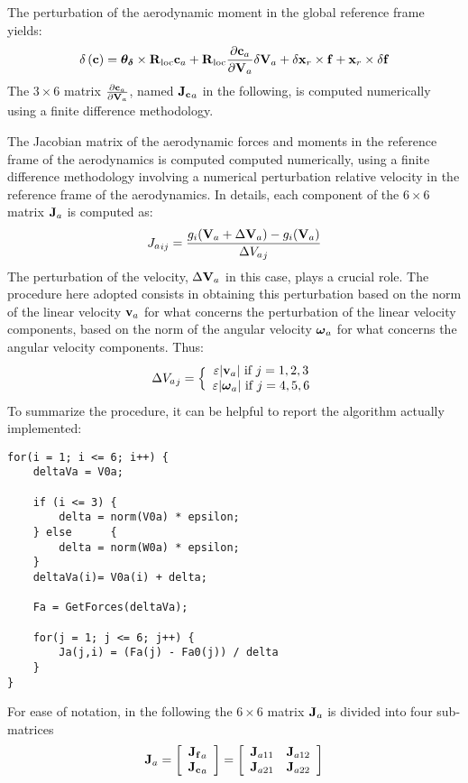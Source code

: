 The perturbation of the aerodynamic moment in the global reference frame
yields:
\begin{equation}
	\delta\plbr{\T{c}} = \T{\theta_{\delta}}\times\T{R}_{\text{loc}}\T{c}_a + 
				\T{R}_{\text{loc}}\frac{\partial\T{c}_a}{\partial\T{V}_a}
				\delta\T{V}_a + \delta \T{x}_r\times\T{f} + 
				\T{x}_r\times\delta\T{f}
\end{equation}
The $3\times6$ matrix $\frac{\partial\T{c}_a}{\partial\T{V}_a}$, 
named $\T{J_c}_a$ in the
following, is computed numerically using a finite difference methodology.

The Jacobian matrix of the aerodynamic forces and moments in the reference 
frame of the aerodynamics is computed computed numerically, using a finite 
difference methodology involving a numerical perturbation relative velocity
in the reference frame of the aerodynamics. In details, each component
of the $6\times6$ matrix $\T{J}_a$ is computed as:
\begin{equation}
	{J_a}_{ij} = \frac{g_i(\T{V}_a + \Delta\T{V}_a) 
		- g_i(\T{V}_a)}{\Delta {V_a}_j}
\end{equation}
The perturbation of the velocity, $\Delta\T{V}_a$ in this case, plays
a crucial role. The procedure here adopted consists in obtaining this
perturbation based on the norm of the linear velocity $\T{v}_a$ for what 
concerns the perturbation of the linear velocity components, based on
the norm of the angular velocity $\T{\omega}_a$ for what concerns 
the angular velocity components. Thus:
\begin{equation}
	\Delta {V_a}_j = \Bigl\{\matr{c}{
		\varepsilon\lvert\T{v}_a\lvert\text{ if $j = 1,2,3$}\\
		\varepsilon\lvert\T{\omega}_a\lvert\text{ if $j = 4,5,6$}
		}
\end{equation}
To summarize the procedure, it can be helpful to report the algorithm
actually implemented:
\begin{verbatim}
for(i = 1; i <= 6; i++)	{
    deltaVa = V0a; 
				
    if (i <= 3)	{
        delta = norm(V0a) * epsilon;
    } else		{
        delta = norm(W0a) * epsilon;
    }
    deltaVa(i)= V0a(i) + delta;
					
    Fa = GetForces(deltaVa);
	
    for(j = 1; j <= 6; j++)	{
        Ja(j,i) = (Fa(j) - Fa0(j)) / delta 
    }
}
\end{verbatim}

For ease of notation, in the following the $6\times6$ matrix $\T{J}_a$ is 
divided into four sub-matrices
\begin{equation}
	\T{J}_a = \sqbr{\matr{c}{\T{J_f}_a\\\T{J_c}_a}}
	=\sqbr{\matr{cc}{\T{J}_{a11} & \T{J}_{a12}\\ \T{J}_{a21} & \T{J}_{a22}}}
\end{equation}

